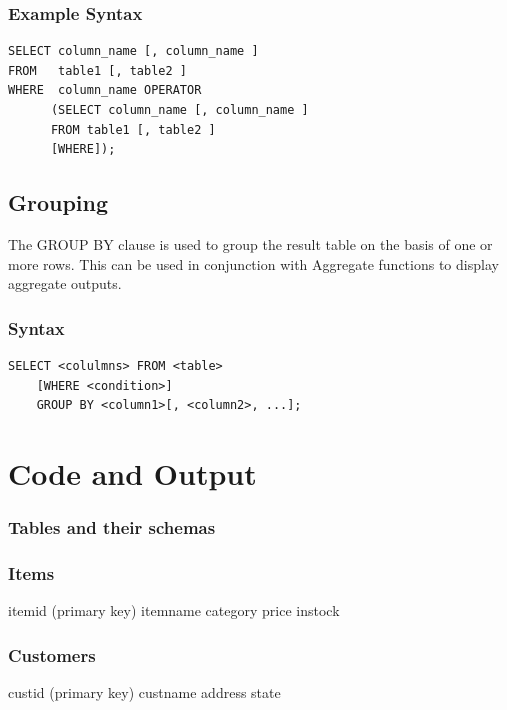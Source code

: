 \subsubsection{Example Syntax}


\begin{verbatim}
SELECT column_name [, column_name ]
FROM   table1 [, table2 ]
WHERE  column_name OPERATOR
      (SELECT column_name [, column_name ]
      FROM table1 [, table2 ]
      [WHERE]);
\end{verbatim}

\subsection{Grouping}

The GROUP BY clause is used to group the result table on the basis of one or more rows. This can be used in conjunction with Aggregate functions to display aggregate outputs.

\subsubsection{Syntax}

\begin{verbatim}
SELECT <colulmns> FROM <table>
	[WHERE <condition>]
	GROUP BY <column1>[, <column2>, ...];
\end{verbatim}

\section{{Code and Output}}

\subsubsection{Tables and their schemas}

\subsubsection{Items}
itemid (primary key)\newline
itemname\newline
category\newline
price\newline
instock\newline

\subsubsection{Customers}
custid (primary key)\newline
custname\newline
address\newline
state\newline

